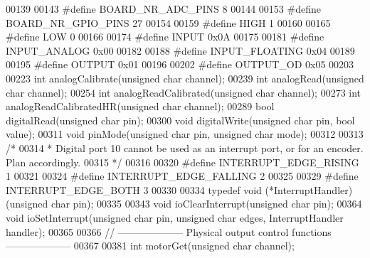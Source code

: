 \begin{DoxyCode}
00139 
00143 \textcolor{preprocessor}{#define BOARD\_NR\_ADC\_PINS 8}
00144 
00153 \textcolor{preprocessor}{#define BOARD\_NR\_GPIO\_PINS 27}
00154 
00159 \textcolor{preprocessor}{#define HIGH 1}
00160 
00165 \textcolor{preprocessor}{#define LOW 0}
00166 
00174 \textcolor{preprocessor}{#define INPUT 0x0A}
00175 
00181 \textcolor{preprocessor}{#define INPUT\_ANALOG 0x00}
00182 
00188 \textcolor{preprocessor}{#define INPUT\_FLOATING 0x04}
00189 
00195 \textcolor{preprocessor}{#define OUTPUT 0x01}
00196 
00202 \textcolor{preprocessor}{#define OUTPUT\_OD 0x05}
00203 
00223 \textcolor{keywordtype}{int} analogCalibrate(\textcolor{keywordtype}{unsigned} \textcolor{keywordtype}{char} channel);
00239 \textcolor{keywordtype}{int} analogRead(\textcolor{keywordtype}{unsigned} \textcolor{keywordtype}{char} channel);
00254 \textcolor{keywordtype}{int} analogReadCalibrated(\textcolor{keywordtype}{unsigned} \textcolor{keywordtype}{char} channel);
00273 \textcolor{keywordtype}{int} analogReadCalibratedHR(\textcolor{keywordtype}{unsigned} \textcolor{keywordtype}{char} channel);
00289 \textcolor{keywordtype}{bool} digitalRead(\textcolor{keywordtype}{unsigned} \textcolor{keywordtype}{char} pin);
00300 \textcolor{keywordtype}{void} digitalWrite(\textcolor{keywordtype}{unsigned} \textcolor{keywordtype}{char} pin, \textcolor{keywordtype}{bool} value);
00311 \textcolor{keywordtype}{void} pinMode(\textcolor{keywordtype}{unsigned} \textcolor{keywordtype}{char} pin, \textcolor{keywordtype}{unsigned} \textcolor{keywordtype}{char} mode);
00312 
00313 \textcolor{comment}{/*}
00314 \textcolor{comment}{ * Digital port 10 cannot be used as an interrupt port, or for an encoder. Plan accordingly.}
00315 \textcolor{comment}{ */}
00316 
00320 \textcolor{preprocessor}{#define INTERRUPT\_EDGE\_RISING 1}
00321 
00324 \textcolor{preprocessor}{#define INTERRUPT\_EDGE\_FALLING 2}
00325 
00329 \textcolor{preprocessor}{#define INTERRUPT\_EDGE\_BOTH 3}
00330 
00334 \textcolor{keyword}{typedef} void (*InterruptHandler)(\textcolor{keywordtype}{unsigned} \textcolor{keywordtype}{char} pin);
00335 
00343 \textcolor{keywordtype}{void} ioClearInterrupt(\textcolor{keywordtype}{unsigned} \textcolor{keywordtype}{char} pin);
00364 \textcolor{keywordtype}{void} ioSetInterrupt(\textcolor{keywordtype}{unsigned} \textcolor{keywordtype}{char} pin, \textcolor{keywordtype}{unsigned} \textcolor{keywordtype}{char} edges, InterruptHandler handler);
00365 
00366 \textcolor{comment}{// -------------------- Physical output control functions --------------------}
00367 
00381 \textcolor{keywordtype}{int} motorGet(\textcolor{keywordtype}{unsigned} \textcolor{keywordtype}{char} channel);

\end{DoxyCode}
